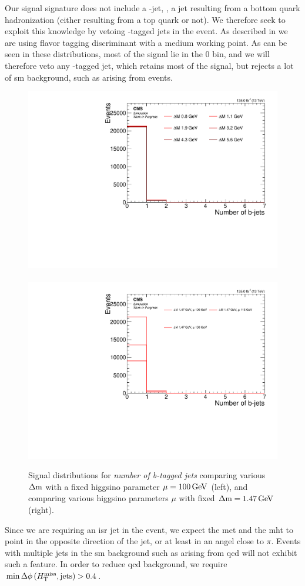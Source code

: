 Our signal signature does not include a \PQb-jet, \ie, a jet resulting from a bottom quark hadronization (either resulting from a top quark or not). We therefore seek to exploit this knowledge by vetoing \PQb-tagged jets in the event. As described in  we are using \DEEPCSV flavor tagging discriminant with a medium working point. As can be seen in these distributions, most of the signal lie in the 0 bin, and we will therefore veto any \PQb-tagged jet, which retains most of the signal, but rejects a lot of \gls{sm} background, such as arising from \ttbar events. 

\begin{figure}[!htb]
\centering
\includegraphics[width=0.48\linewidth]{plots/signal_common_distributions_fixed_mu/none_BTagsDeepMedium.pdf} \,
\includegraphics[width=0.48\linewidth]{plots/signal_common_distributions_fixed_dm/none_BTagsDeepMedium.pdf}  \\
\caption[Signal \emph{number of b-tagged jets} distributions]{ Signal distributions for \emph{number of b-tagged jets} comparing various $\Delta\mathrm{m}$ with a fixed higgsino parameter $\mu=100\,\text{Ge\hspace{-.08em}V}$ (left), and comparing various higgsino parameters $\mu$ with fixed $\Delta\mathrm{m}=1.47\,\text{Ge\hspace{-.08em}V}$ (right).}
\label{fig:signal-bjets}
\end{figure}

Since we are requiring an \gls{isr} jet in the event, we expect the \gls{met} and the \gls{mht} to point in the opposite direction of the jet, or at least in an angel close to $\pi$. Events with multiple jets in the \gls{sm} background such as arising from \gls{qcd} will not exhibit such a feature. In order to reduce \gls{qcd} background, we require $\min{\Delta\phi\left(\ensuremath{H_{\mathrm{T}}^{\text{miss}}},\mathrm{jets}\right)} > 0.4$.

